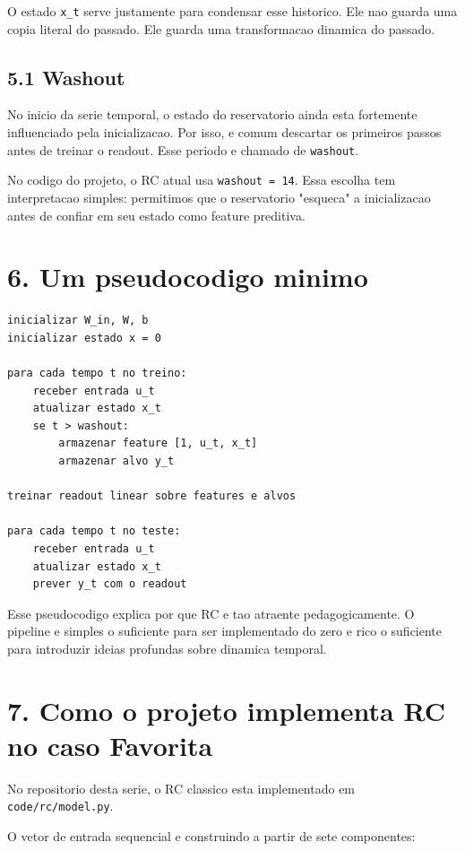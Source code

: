 \documentclass[12pt]{article}
\begin{document}
O estado \texttt{x\_t} serve justamente para condensar esse historico. Ele nao guarda uma copia literal do passado. Ele guarda uma transformacao dinamica do passado.

\subsection{5.1 Washout}\label{51-washout}

No inicio da serie temporal, o estado do reservatorio ainda esta fortemente influenciado pela inicializacao. Por isso, e comum descartar os primeiros passos antes de treinar o readout. Esse periodo e chamado de \texttt{washout}.

No codigo do projeto, o RC atual usa \texttt{washout\ =\ 14}. Essa escolha tem interpretacao simples: permitimos que o reservatorio "esqueca" a inicializacao antes de confiar em seu estado como feature preditiva.

\section{6. Um pseudocodigo minimo}\label{6-um-pseudocodigo-minimo}

\begin{verbatim}
inicializar W_in, W, b
inicializar estado x = 0

para cada tempo t no treino:
    receber entrada u_t
    atualizar estado x_t
    se t > washout:
        armazenar feature [1, u_t, x_t]
        armazenar alvo y_t

treinar readout linear sobre features e alvos

para cada tempo t no teste:
    receber entrada u_t
    atualizar estado x_t
    prever y_t com o readout
\end{verbatim}

Esse pseudocodigo explica por que RC e tao atraente pedagogicamente. O pipeline e simples o suficiente para ser implementado do zero e rico o suficiente para introduzir ideias profundas sobre dinamica temporal.

\section{7. Como o projeto implementa RC no caso Favorita}\label{7-como-o-projeto-implementa-rc-no-caso-favorita}

No repositorio desta serie, o RC classico esta implementado em \texttt{code/rc/model.py}.

O vetor de entrada sequencial e construindo a partir de sete componentes:
\end{document}
